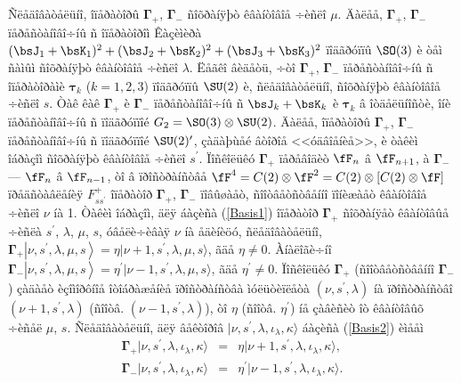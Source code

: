 Ñëåäîâàòåëüíî, îïåðàòîðû $\boldsymbol{\Gamma}_+$, $\boldsymbol{\Gamma}_-$ ñîõðàíÿþò êâàíòîâîå ÷èñëî $\mu$. Äàëåå, $\boldsymbol{\Gamma}_+$, $\boldsymbol{\Gamma}_-$ ïåðåñòàíîâî÷íû ñ îïåðàòîðîì Êàçèìèðà $(\bsJ_1+\bsK_1)^2+(\bsJ_2+\bsK_2)^2+(\bsJ_3+\bsK_3)^2$ ïîäãðóïïû $\SO(3)$ è òåì ñàìûì ñîõðàíÿþò êâàíòîâîå ÷èñëî $\lambda$. Ëåãêî âèäåòü, ÷òî $\boldsymbol{\Gamma}_+$, $\boldsymbol{\Gamma}_-$ ïåðåñòàíîâî÷íû ñ îïåðàòîðàìè $\boldsymbol{\tau}_k$ ($k=1,2,3$) ïîäãðóïïû $\SU(2)$ è, ñëåäîâàòåëüíî, ñîõðàíÿþò êâàíòîâîå ÷èñëî $s$. Òàê êàê $\boldsymbol{\Gamma}_+$ è $\boldsymbol{\Gamma}_-$ ïåðåñòàíîâî÷íû ñ $\bsJ_k+\bsK_k$ è $\boldsymbol{\tau}_k$ â îòäåëüíîñòè, îíè ïåðåñòàíîâî÷íû ñ ïîäãðóïïîé $G_2=\SO(3)\otimes\SU(2)$. Äàëåå, îïåðàòîðû $\boldsymbol{\Gamma}_+$, $\boldsymbol{\Gamma}_-$ ïåðåñòàíîâî÷íû ñ ïîäãðóïïîé $\SU(2)^\prime$, çàäàþùåé âòîðîå <<óäâîåíèå>>, è òàêèì îáðàçîì ñîõðàíÿþò êâàíòîâîå ÷èñëî $s^\prime$. Ïîñêîëüêó $\boldsymbol{\Gamma}_+$ ïåðåâîäèò $\fF_n$ â $\fF_{n+1}$, à $\boldsymbol{\Gamma}_-$ --- $\fF_n$ â $\fF_{n-1}$, òî â ïðîñòðàíñòâå $\fF^4=C(2)\otimes\fF^2=C(2)\otimes[C(2)\otimes\fF]$ ïðåäñòàâëåíèÿ $F^+_{ss^\prime}$ îïåðàòîð $\boldsymbol{\Gamma}_+$, $\boldsymbol{\Gamma}_-$ ïîâûøàåò, ñîîòâåòñòâåííî ïîíèæàåò êâàíòîâîå ÷èñëî $\nu$ íà 1. Òàêèì îáðàçîì, äëÿ áàçèñà (\ref{Basis1}) îïåðàòîð $\boldsymbol{\Gamma}_+$ ñîõðàíÿåò êâàíòîâûå ÷èñëà $s^\prime$, $\lambda$, $\mu$, $s$, óâåëè÷èâàÿ $\nu$ íà åäèíèöó, ñëåäîâàòåëüíî, $\boldsymbol{\Gamma}_+\left|\nu,s^\prime,\lambda,\mu,s\right\rangle=
\eta|\nu+1,s^\prime,\lambda,\mu,s\rangle$, ãäå $\eta\neq 0$. Àíàëîãè÷íî $\boldsymbol{\Gamma}_-\left|\nu,s^\prime,\lambda,\mu,s\right\rangle=
\eta^\prime|\nu-1,s^\prime,\lambda,\mu,s\rangle$, ãäå $\eta^\prime\neq 0$. Ïîñêîëüêó $\boldsymbol{\Gamma}_+$ (ñîîòâåòñòâåííî $\boldsymbol{\Gamma}_-$) çàäàåò èçîìîðôíîå îòîáðàæåíèå ïðîñòðàíñòâà ìóëüòèïëåòà $(\nu,s^\prime,\lambda)$ íà ïðîñòðàíñòâî $(\nu+1,s^\prime,\lambda)$ (ñîîòâ. $(\nu-1,s^\prime,\lambda)$), òî $\eta$ (ñîîòâ. $\eta^\prime$) íå çàâèñèò îò êâàíòîâûõ ÷èñåë $\mu$, $s$. Ñëåäîâàòåëüíî, äëÿ âåêòîðîâ $|\nu,s^\prime,\lambda,\iota_\lambda,\kappa\rangle$ áàçèñà (\ref{Basis2}) èìååì
\begin{eqnarray}
\boldsymbol{\Gamma}_+|\nu,s^\prime,\lambda,\iota_\lambda,\kappa\rangle&=&\eta
|\nu+1,s^\prime,\lambda,\iota_\lambda,\kappa\rangle,\label{Hom1}\\
\boldsymbol{\Gamma}_-|\nu,s^\prime,\lambda,\iota_\lambda,\kappa\rangle&=&\eta^\prime
|\nu-1,s^\prime,\lambda,\iota_\lambda,\kappa\rangle.\label{Hom2}
\end{eqnarray}
